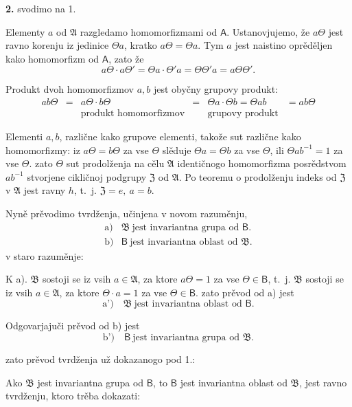 \documentclass[11pt]{article}
\begin{document}
\textbf{2.} svodimo na 1.

Elementy \(a\) od \(\mathfrak A\) razgledamo homomorfizmami od \(\mathsf A\). Ustanovjujemo, že \(a\Theta\) jest ravno korenju iz jedinice \(\Theta a\), kratko \(a\Theta=\Theta a\). Tym \(a\) jest naistino oprěděljen kako homomorfizm od \(\mathsf A\), zato že
\[
a\Theta\cdot a\Theta'=\Theta a\cdot\Theta' a=\Theta\Theta' a=a\Theta\Theta'.
\]

Produkt dvoh homomorfizmov \(a,b\) jest obyčny grupovy produkt:
\[
\begin{array}{cccccc}
ab\Theta&=&a\Theta\cdot b\Theta&=&\Theta a\cdot\Theta b=\Theta ab&=ab\Theta\\
&&\text{produkt homomorfizmov}&&\text{grupovy produkt}&
\end{array}
\]

Elementi \(a,b\), različne kako grupove elementi, takože sut različne kako homomorfizmy: iz \(a\Theta=b\Theta\) za vse \(\Theta\) slěduje \(\Theta a=\Theta b\) za vse \(\Theta\), ili \(\Theta ab^{-1}=1\) za vse \(\Theta\). zato \(\Theta\) sut prodolženja na cělu \(\mathfrak A\) identičnogo homomorfizma posrědstvom \(ab^{-1}\) stvorjene cikličnoj podgrupy \(\mathfrak Z\) od \(\mathfrak A\). Po teoremu o prodolženju indeks od \(\mathfrak Z\) v \(\mathfrak A\) jest ravny \(h\), t.~j. \(\mathfrak Z=e,\ a=b\).

Nyně prěvodimo tvrdženja, učinjena v novom razuměnju,
\[
\begin{array}{ll}
\text{a)}& \mathfrak B\ \text{jest invariantna grupa od }\mathsf B.\\
\text{b)}& \mathsf B\ \text{jest invariantna oblast od }\mathfrak B.
\end{array}
\]
v staro razuměnje:

K a). \(\mathfrak B\) sostoji se iz vsih \(a\in\mathfrak A\), za ktore \(a\Theta=1\) za vse \(\Theta\in\mathsf B\), t.~j. \(\mathfrak B\) sostoji se iz vsih \(a\in\mathfrak A\), za ktore \(\Theta\cdot a=1\) za vse \(\Theta\in\mathsf B\). zato prěvod od a) jest
\[
\text{a')} \quad \mathfrak B\ \text{jest invariantna oblast od }\mathsf B.
\]

Odgovarjajuči prěvod od b) jest
\[
\text{b')} \quad \mathsf B\ \text{jest invariantna grupa od }\mathfrak B.
\]

zato prěvod tvrdženja už dokazanogo pod 1.:

Ako \(\mathfrak B\) jest invariantna grupa od \(\mathsf B\), to \(\mathsf B\) jest invariantna oblast od \(\mathfrak B\),
jest ravno tvrdženju, ktoro trěba dokazati:
\end{document}
